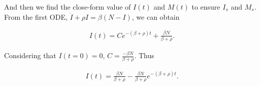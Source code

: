 And then we find the close-form value of $I(t)$ and $M(t)$ to ensure $I_{s}$ and $M_{s}$.
From the first ODE, $\dot{I} + \rho I = \beta (N-I)$, we can obtain
\begin{small}
\begin{equation}
\nonumber
\begin{aligned}
I(t) = C e^{-(\beta + \rho)t} + \frac{ \beta N }{ \beta + \rho }.
\end{aligned}
\end{equation}
\end{small}
Considering that $I(t=0) = 0$, $C = \frac{ -\beta N }{ \beta + \rho }$.
Thus
\begin{small}
\begin{equation}
\nonumber
\begin{aligned}
I(t) = \frac{ \beta N }{ \beta + \rho } - \frac{ \beta N }{ \beta + \rho } e^{-(\beta + \rho)t}.
\end{aligned}
\end{equation}
\end{small}

